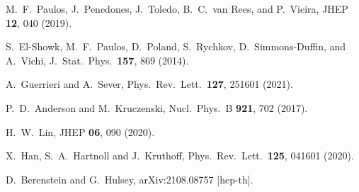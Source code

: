 \documentclass[aps,prc,reprint,superscriptaddress,nofootinbib]{revtex4-2}
\begin{document}
\begin{thebibliography}{999}
M.~F.~Paulos, J.~Penedones, J.~Toledo, B.~C.~van Rees, and P.~Vieira,
JHEP \textbf{12}, 040 (2019).


S.~El-Showk, M.~F.~Paulos, D.~Poland, S.~Rychkov, D.~Simmons-Duffin, and A.~Vichi,
J.\ Stat.\ Phys.\ \textbf{157}, 869 (2014).

A.~Guerrieri and A.~Sever,
Phys.\ Rev.\ Lett.\ \textbf{127}, 251601 (2021).

P.~D.~Anderson and M.~Kruczenski,
Nucl.\ Phys.\ B \textbf{921}, 702 (2017).

H.~W.~Lin,
JHEP \textbf{06}, 090 (2020).

X.~Han, S.~A.~Hartnoll and J.~Kruthoff,
Phys.\ Rev.\ Lett.\ \textbf{125}, 041601 (2020).

D.~Berenstein and G.~Hulsey,
arXiv:2108.08757 [hep-th].


\end{thebibliography}
\end{document}
